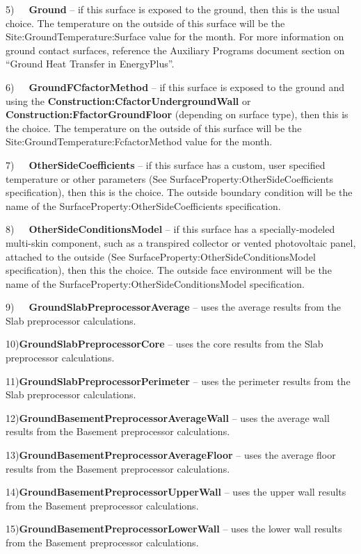5)~~~\textbf{Ground} -- if this surface is exposed to the ground, then this is the usual choice. The temperature on the outside of this surface will be the Site:GroundTemperature:Surface value for the month. For more information on ground contact surfaces, reference the Auxiliary Programs document section on ``Ground Heat Transfer in EnergyPlus''.

6)~~~\textbf{GroundFCfactorMethod} -- if this surface is exposed to the ground and using the \textbf{Construction:CfactorUndergroundWall} or \textbf{Construction:FfactorGroundFloor} (depending on surface type), then this is the choice. The temperature on the outside of this surface will be the Site:GroundTemperature:FcfactorMethod value for the month.

7)~~~\textbf{OtherSideCoefficients} -- if this surface has a custom, user specified temperature or other parameters (See SurfaceProperty:OtherSideCoefficients specification), then this is the choice. The outside boundary condition will be the name of the SurfaceProperty:OtherSideCoefficients specification.

8)~~~\textbf{OtherSideConditionsModel} -- if this surface has a specially-modeled multi-skin component, such as a transpired collector or vented photovoltaic panel, attached to the outside (See SurfaceProperty:OtherSideConditionsModel specification), then this the choice. The outside face environment will be the name of the SurfaceProperty:OtherSideConditionsModel specification.

9)~~~\textbf{GroundSlabPreprocessorAverage} -- uses the average results from the Slab preprocessor calculations.

10)\textbf{GroundSlabPreprocessorCore} -- uses the core results from the Slab preprocessor calculations.

11)\textbf{GroundSlabPreprocessorPerimeter} -- uses the perimeter results from the Slab preprocessor calculations.

12)\textbf{GroundBasementPreprocessorAverageWall} -- uses the average wall results from the Basement preprocessor calculations.

13)\textbf{GroundBasementPreprocessorAverageFloor} -- uses the average floor results from the Basement preprocessor calculations.

14)\textbf{GroundBasementPreprocessorUpperWall} -- uses the upper wall results from the Basement preprocessor calculations.

15)\textbf{GroundBasementPreprocessorLowerWall} -- uses the lower wall results from the Basement preprocessor calculations.

